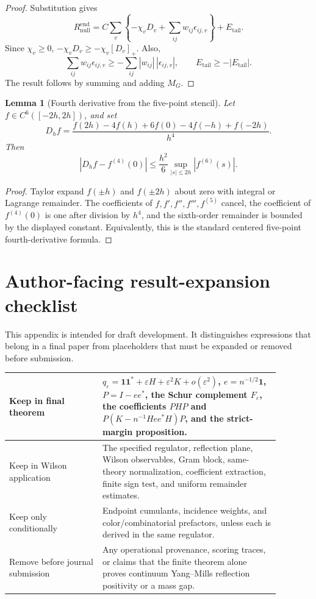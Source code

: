 \documentclass[11pt]{article}
\newtheorem{lemma}[theorem]{Lemma}
\newcommand{\one}{\mathbf 1}
\newcommand{\eps}{\varepsilon}
\begin{document}
\begin{proof}
Substitution gives
\[
  R_{\mathrm{null}}^{\mathrm{end}}
  =C\sum_v\left\{-\chi_vD_v+\sum_{ij}w_{ij}\epsilon_{ij,v}\right\}+E_{\mathrm{tail}}.
\]
Since \(\chi_v\ge0\), \(-\chi_vD_v\ge-\chi_v[D_v]_+\).  Also,
\[
  \sum_{ij}w_{ij}\epsilon_{ij,v}\ge-\sum_{ij}|w_{ij}|\,|\epsilon_{ij,v}|,
  \qquad E_{\mathrm{tail}}\ge-|E_{\mathrm{tail}}|.
\]
The result follows by summing and adding \(M_G\).
\end{proof}

\begin{lemma}[Fourth derivative from the five-point stencil]
\label{lem:app-fourth-difference}
Let \(f\in C^6([-2h,2h])\), and set
\[
  D_hf=
  \frac{f(2h)-4f(h)+6f(0)-4f(-h)+f(-2h)}{h^4}.
\]
Then
\[
  \left|D_hf-f^{(4)}(0)\right|
  \le
  \frac{h^2}{6}\sup_{|s|\le2h}|f^{(6)}(s)|.
\]
\end{lemma}

\begin{proof}
Taylor expand \(f(\pm h)\) and \(f(\pm2h)\) about zero with integral or Lagrange remainder.  The coefficients of \(f,f',f'',f''',f^{(5)}\) cancel, the coefficient of \(f^{(4)}(0)\) is one after division by \(h^4\), and the sixth-order remainder is bounded by the displayed constant.  Equivalently, this is the standard centered five-point fourth-derivative formula.
\end{proof}

\section{Author-facing result-expansion checklist}
\label{app:author-checklist}

This appendix is intended for draft development.  It distinguishes expressions that belong in a final paper from placeholders that must be expanded or removed before submission.

\begin{center}
\begin{tabular}{p{0.30\linewidth}p{0.58\linewidth}}
\toprule
Keep in final theorem & \(q_\eps=\one\one^*+\eps H+\eps^2K+o(\eps^2)\), \(e=n^{-1/2}\one\), \(P=I-ee^*\), the Schur complement \(F_\eps\), the coefficients \(PHP\) and \(P(K-n^{-1}Hee^*H)P\), and the strict-margin proposition. \\
\midrule
Keep in Wilson application & The specified regulator, reflection plane, Wilson observables, Gram block, same-theory normalization, coefficient extraction, finite sign test, and uniform remainder estimates. \\
\midrule
Keep only conditionally & Endpoint cumulants, incidence weights, and color/combinatorial prefactors, unless each is derived in the same regulator. \\
\midrule
Remove before journal submission & Any operational provenance, scoring traces, or claims that the finite theorem alone proves continuum Yang--Mills reflection positivity or a mass gap. \\
\bottomrule
\end{tabular}
\end{center}
\end{document}
